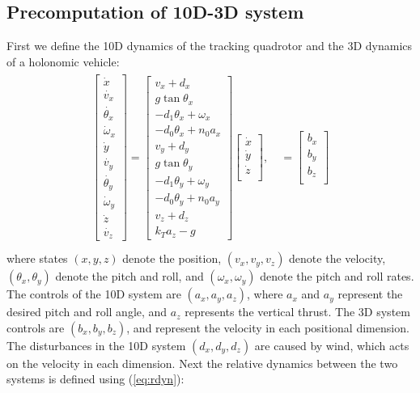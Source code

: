 \subsection{Precomputation of 10D-3D system}
First we define the 10D dynamics of the tracking quadrotor and the 3D dynamics of a holonomic vehicle:
\begin{equation}
\label{eq:Quad10D_dyn}
\begin{aligned}
\begin{array}{c}
\left[
\begin{array}{c}
\dot{x}\\
\dot{v_x}\\
\dot{\theta_x}\\
\dot\omega_x\\
\dot{y}\\
\dot{v_y}\\
\dot{\theta_y}\\
\dot\omega_y\\
\dot{z}\\
\dot{v_z}
\end{array}
\right]
=
\left[
\begin{array}{c}
v_x + d_x\\
g \tan \theta_x\\
-d_1 \theta_x + \omega_x\\
-d_0 \theta_x + n_0 a_x\\
v_y + d_y\\
g \tan \theta_y\\
-d_1 \theta_y + \omega_y\\
-d_0 \theta_y + n_0 a_y\\
v_z + d_z\\
k_T a_z - g
\end{array}
\right]
\left[
\begin{array}{c}
\dot{x}\\
\dot{y}\\
\dot{z}\\
\end{array}
\right], \quad
=
\left[
\begin{array}{c}
b_x\\
b_y\\
b_z \\
\end{array}
\right]
\end{array}\\
\end{aligned}
\end{equation}
where states $(x, y, z)$ denote the position, $(v_x, v_y, v_z)$ denote the velocity, $(\theta_x, \theta_y)$ denote the pitch and roll, and $(\omega_x, \omega_y)$ denote the pitch and roll rates. The controls of the 10D system are $(a_x, a_y, a_z)$, where $a_x$ and $a_y$ represent the desired pitch and roll angle, and $a_z$ represents the vertical thrust. The 3D system controls are $(b_x, b_y, b_z)$, and represent the velocity in each positional dimension. The disturbances in the 10D system $(d_x, d_y, d_z)$ are caused by wind, which acts on the velocity in each dimension. Next the relative dynamics between the two systems is defined using (\ref{eq:rdyn}):
